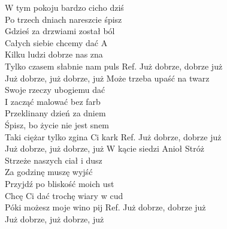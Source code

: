 \auth{}
\begin{flushleft}
W tym pokoju bardzo cicho dziś \\
Po trzech dniach nareszcie śpisz \\
Gdzieś za drzwiami został ból \tab{}\\
Całych siebie chcemy dać \tab{} A\\
Kilku ludzi dobrze nas zna \tab{}\\
Tylko czasem słabnie nam puls 
\hops
Ref. Już dobrze, dobrze już \tab{}\\
\hspace{0.9cm}Już dobrze, już dobrze, już 
\hops
Może trzeba upaść na twarz\\
Swoje rzeczy ubogiemu dać\\
I zacząć malować bez farb\\
Przeklinany dzień za dniem\\
Śpisz, bo życie nie jest snem\\
Taki ciężar tylko zgina Ci kark
\hops
Ref. Już dobrze, dobrze już\\
\hspace{0.9cm}Już dobrze, już dobrze, już
\hops
W kącie siedzi Anioł Stróż\\
Strzeże naszych ciał i dusz\\
Za godzinę muszę wyjść\\
Przyjdź po bliskość moich ust\\
Chcę Ci dać trochę wiary w cud\\
Póki możesz moje wino pij
\hops
Ref. Już dobrze, dobrze już\\
\hspace{0.9cm}Już dobrze, już dobrze, już
\end{flushleft}
\newpage